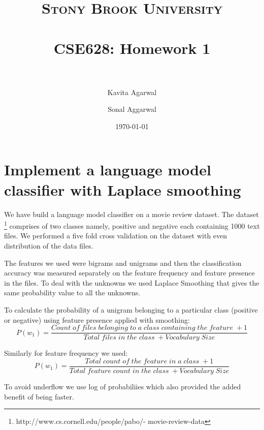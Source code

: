 \documentclass[paper=a4, fontsize=11pt]{scrartcl}
\title{
		\usefont{OT1}{bch}{b}{n}
		\normalfont \normalsize \textsc{Stony Brook University} \\ [25pt]
		\horrule{0.5pt} \\[0.4cm]
		\huge CSE628: Homework 1 \\
		\horrule{2pt} \\[0.5cm]
}
\author{
Kavita Agarwal\\
 \and
Sonal Aggarwal\\
}
\date{\small{\today}}
\numberwithin{equation}{section}		%
\numberwithin{figure}{section}			%
\numberwithin{table}{section}				%
\begin{document}
\maketitle
\section{Implement a language model classifier with Laplace smoothing}
We have build a language model classifier on a movie review dataset. The dataset \footnote{http://www.cs.cornell.edu/people/pabo/-
movie-review-data} comprises of two classes namely, positive and negative each containing 1000 text files. We performed a five fold cross validation on the dataset with even distribution of the data files.

The features we used were bigrams and unigrams and then the classification accuracy was measured separately on the feature frequency and feature presence in the files. To deal with the unknowns we used Laplace Smoothing that gives the same probability value to all the unknowns.

To calculate the probability of a unigram belonging to a particular class (positive or negative) using feature presence applied with smoothing:
\begin{equation}
P(w_1) = \frac{Count \; of \; files \; belonging \; to \; a \; class \; containing \; the \; feature \; + 1}{ Total \; files \; in \; the \; class \; + Vocabulary \; Size}
\end{equation}

Similarly for feature frequency we used:
\begin{equation}
P(w_1) = \frac{Total \; count \; of \;the \; feature \; in \; a \; class \; + 1}{ Total \; feature \; count \; in \; the \; class \; + Vocabulary \; Size}
\end{equation}

To avoid underflow we use log of probabiliies which also provided the added benefit of being faster.
\end{document}

